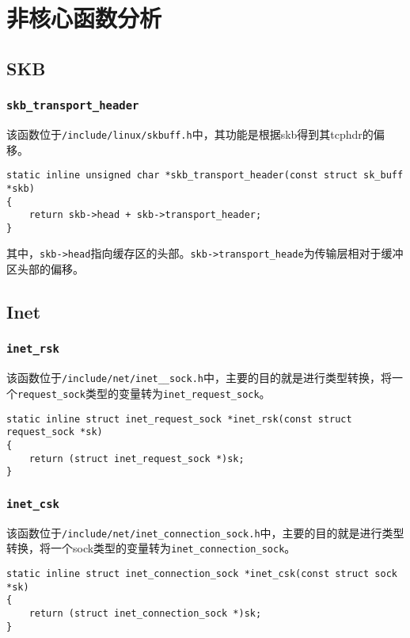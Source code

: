 \chapter{非核心函数分析}

\minitoc

\section{SKB}
    \subsection{\texttt{skb_transport_header}}
        
        该函数位于\texttt{/include/linux/skbuff.h}中，其功能是根据skb得到其tcphdr的偏移。
\begin{verbatim}
static inline unsigned char *skb_transport_header(const struct sk_buff *skb)
{
    return skb->head + skb->transport_header;
}
\end{verbatim}

        其中，\texttt{skb->head}指向缓存区的头部。\texttt{skb->transport_heade}为传输层相对于缓冲区头部的偏移。

\section{Inet}
    \subsection{\texttt{inet_rsk}}

        该函数位于\texttt{/include/net/inet__sock.h}中，主要的目的就是进行类型转换，将一个\texttt{request_sock}类型的变量转为\texttt{inet_request_sock}。

\begin{verbatim}
static inline struct inet_request_sock *inet_rsk(const struct request_sock *sk)
{
    return (struct inet_request_sock *)sk;
}
\end{verbatim}
    
    \subsection{\texttt{inet_csk}}
        该函数位于\texttt{/include/net/inet_connection_sock.h}中，主要的目的就是进行类型转换，将一个sock类型的变量转为\texttt{inet_connection_sock}。

\begin{verbatim}
static inline struct inet_connection_sock *inet_csk(const struct sock *sk)
{
    return (struct inet_connection_sock *)sk;
}
\end{verbatim}

